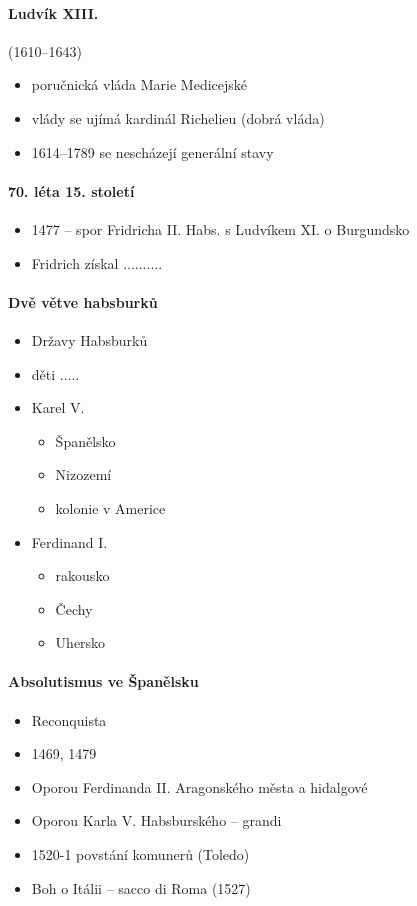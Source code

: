\paragraph{Ludvík XIII.} (1610--1643)
\begin{itemize}
\item poručnická vláda Marie Medicejské
\item vlády se ujímá kardinál Richelieu (dobrá vláda)
\item 1614--1789 se nescházejí generální stavy
\end{itemize}


\paragraph{70. léta 15. století}
\begin{itemize}
\item 1477 -- spor Fridricha II. Habs. s Ludvíkem XI. o Burgundsko
\item Fridrich získal ..........
\end{itemize}

\paragraph{Dvě větve habsburků}
\begin{itemize}
\item Državy Habsburků
\item děti .....
\item Karel V.
	\begin{itemize}
	\item Španělsko
	\item Nizozemí
	\item kolonie v Americe
	\end{itemize}
\item Ferdinand I.
	\begin{itemize}
	\item rakousko
	\item Čechy
	\item Uhersko
	\end{itemize}
\end{itemize}

\paragraph{Absolutismus ve Španělsku}
\begin{itemize}
\item Reconquista
\item 1469, 1479
\item Oporou Ferdinanda II. Aragonského města a hidalgové
\item Oporou Karla V. Habsburského -- grandi
\item 1520-1 povstání komunerů (Toledo)
\item Boh o Itálii -- sacco di Roma (1527)
\end{itemize}

